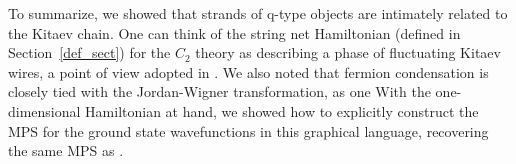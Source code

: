 To summarize, we showed that strands of q-type objects are intimately related to the Kitaev chain. 
One can think of the string net Hamiltonian (defined in Section~\ref{def_sect}) for the $C_2$ theory as describing a phase of fluctuating Kitaev wires, a point of view adopted in \cite{tarantino2016,ware2016,kapustin2017}.
We also noted that fermion condensation is closely tied with the Jordan-Wigner transformation, as one 
With the one-dimensional Hamiltonian at hand, we showed how to explicitly construct the MPS for the ground state wavefunctions in this graphical language, recovering the same MPS as \cite{fidkowski2011,turzillo2016,bultinck2017b}.

